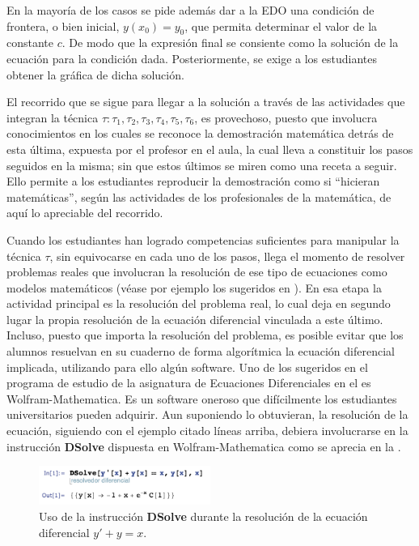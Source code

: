 \documentclass[spanish]{textolivre}
\begin{document}
En la mayoría de los casos se pide además dar a la EDO una condición de frontera, o bien inicial, $y(x_0)=y_0$, que permita determinar el valor de la constante $c$. De modo que la expresión final se consiente como la solución de la ecuación para la condición dada. Posteriormente, se exige a los estudiantes obtener la gráfica de dicha solución.

El recorrido que se sigue para llegar a la solución a través de las actividades que integran la técnica $\tau: \tau_1, \tau_2, \tau_3, \tau_4, \tau_5, \tau_6$, es provechoso, puesto que involucra conocimientos en los cuales se reconoce la demostración matemática detrás de esta última, expuesta por el profesor en el aula, la cual lleva a constituir los pasos seguidos en la misma; sin que estos últimos se miren como una receta a seguir. Ello permite a los estudiantes reproducir la demostración como si “hicieran matemáticas”, según las actividades de los profesionales de la matemática, de aquí lo apreciable del recorrido. 

Cuando los estudiantes han logrado competencias suficientes para manipular la técnica $\tau$, sin equivocarse en cada uno de los pasos, llega el momento de resolver problemas reales que involucran la resolución de ese tipo de ecuaciones como modelos matemáticos (véase por ejemplo los sugeridos en \textcite[p.~22-29]{zill2018}). En esa etapa la actividad principal es la resolución del problema real, lo cual deja en segundo lugar la propia resolución de la ecuación diferencial vinculada a este último. Incluso, puesto que importa la resolución del problema, es posible evitar que los alumnos resuelvan en su cuaderno de forma algorítmica la ecuación diferencial implicada, utilizando para ello algún software. Uno de los sugeridos en el programa de estudio de la asignatura de Ecuaciones Diferenciales en el \textcite{tecnologico_nacional_de_mexico_tecnm_ecuaciones_2016} es Wolfram-Mathematica. Es un software oneroso que difícilmente los estudiantes universitarios pueden adquirir. Aun suponiendo lo obtuvieran, la resolución de la ecuación, siguiendo con el ejemplo citado líneas arriba, debiera involucrarse en la instrucción \textbf{DSolve} dispuesta en Wolfram-Mathematica como se aprecia en la .

\begin{figure}[htbp]
 \centering
 \includegraphics[width=0.5\textwidth]{fig1-35052.png}
 \caption{Uso de la instrucción \textbf{DSolve} durante la resolución de la ecuación diferencial $y'+y=x$.}
 \label{fig1}
\end{figure}
\end{document}
